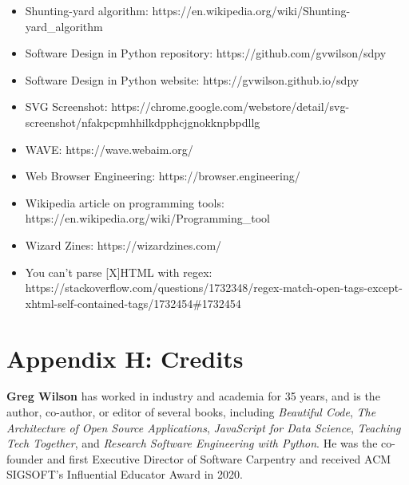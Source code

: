 \documentclass{scrbook}
\begin{document}
\begin{itemize}
\item Shunting-yard algorithm: https://en.wikipedia.org/wiki/Shunting-yard\_algorithm

\item Software Design in Python repository: https://github.com/gvwilson/sdpy

\item Software Design in Python website: https://gvwilson.github.io/sdpy

\item SVG Screenshot: https://chrome.google.com/webstore/detail/svg-screenshot/nfakpcpmhhilkdpphcjgnokknpbpdllg

\item WAVE: https://wave.webaim.org/

\item Web Browser Engineering: https://browser.engineering/

\item Wikipedia article on programming tools: https://en.wikipedia.org/wiki/Programming\_tool

\item Wizard Zines: https://wizardzines.com/

\item You can't parse [X]HTML with regex: https://stackoverflow.com/questions/1732348/regex-match-open-tags-except-xhtml-self-contained-tags/1732454\#1732454

\end{itemize}

\chapter{Appendix H: Credits}\label{credits}


\textbf{Greg Wilson} has worked in industry and academia for 35 years, and is the author, co-author, or editor of several books, including \emph{Beautiful Code}, \emph{The Architecture of Open Source Applications}, \emph{JavaScript for Data Science}, \emph{Teaching Tech Together}, and \emph{Research Software Engineering with Python}. He was the co-founder and first Executive Director of Software Carpentry and received ACM SIGSOFT's Influential Educator Award in 2020.

\printindex
\end{document}
